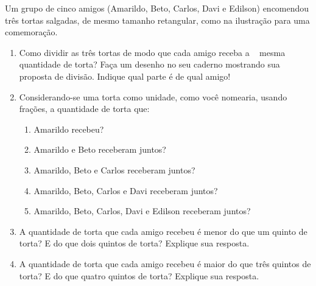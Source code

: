 \begin{atividade}{}\label{chap2-ativ3}
\tikzset{x=1cm,y=1cm}

Um grupo de cinco amigos (Amarildo, Beto, Carlos, Davi e Edilson) encomendou três tortas salgadas, de mesmo tamanho retangular, como na ilustração para uma comemoração.

\begin{center}

\end{center}

\begin{enumerate}  %
  \item     Como dividir as três tortas de modo que cada amigo receba a ~ mesma quantidade de torta? Faça um desenho no seu caderno mostrando sua proposta de divisão. Indique qual parte é de qual amigo!
  \item     Considerando-se uma torta como unidade, como você nomearia, usando frações, a quantidade de torta que:
\begin{enumerate}[label=\textbf{\roman*)}, left=1em] %
      \item         Amarildo recebeu?
      \item         Amarildo e Beto receberam juntos?
      \item         Amarildo, Beto e Carlos receberam juntos?
      \item         Amarildo, Beto, Carlos e Davi receberam juntos?
      \item         Amarildo, Beto, Carlos, Davi e Edilson receberam juntos?
\end{enumerate} %

  \item     A quantidade de torta que cada amigo recebeu é menor do que um quinto de torta? E do que dois quintos de torta? Explique sua resposta.
  \item     A quantidade de torta que cada amigo recebeu é maior do que três quintos de torta? E do que quatro quintos de torta? Explique sua resposta.
\end{enumerate} %
\end{atividade}

